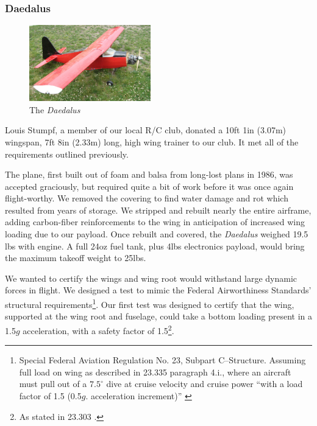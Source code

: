 \documentclass[pdftex,10pt,letter]{article}
\newcommand{\degrees}[1]
{
\begin{math}
#1^{\circ} 
\end{math}
}
\begin{document}
\subsubsection{Daedalus}
\begin{figure}
	\includegraphics[width=0.47\textwidth]{../images/daedalus_isometric.jpg}
	\caption{The \emph{Daedalus}}
	\label{fig:daedalus}
\end{figure}
Louis Stumpf, a member of our local R/C club, donated a 10ft 1in (3.07m) wingspan, 7ft 8in (2.33m) long, high wing trainer to our club. It met all of the requirements outlined previously.

The plane, first built out of foam and balsa from long-lost plans in 1986, was accepted graciously, but required quite a bit of work before it was once again flight-worthy. We removed the covering to find water damage and rot which resulted from years of storage. We stripped and rebuilt nearly the entire airframe, adding carbon-fiber reinforcements to the wing in anticipation of increased wing loading due to our payload. Once rebuilt and covered,  the \emph{Daedalus} weighed 19.5 lbs with engine. A full 24oz fuel tank, plus 4lbs electronics payload, would bring the maximum takeoff weight to 25lbs.

We wanted to certify the wings and wing root would withstand large dynamic forces in flight. 
We designed a test to mimic the 
Federal Airworthiness Standards' structural requirements\footnote{Special Federal Aviation Regulation No. 23, Subpart C--Structure. Assuming full load on wing as described in 23.335 paragraph 4.i., where an aircraft must pull out of a \degrees{7.5} dive at cruise velocity and cruise power ``with a load factor of 1.5 (0.5$g$. acceleration increment)'' \cite{far23}}. Our first test was designed to certify that the wing, supported at the wing root and fuselage, could take a bottom loading present in a 1.5$g$ acceleration, with a safety factor of 1.5\footnote{As stated in 23.303 \cite{far23}.}.
\end{document}
